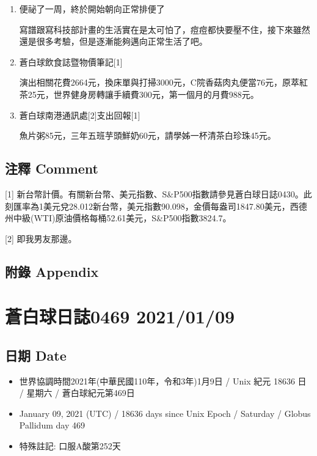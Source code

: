 \documentclass[
]{article}
\providecommand{\tightlist}{%
  \setlength{\itemsep}{0pt}\setlength{\parskip}{0pt}}
\begin{document}
\begin{enumerate}
\def\labelenumi{\arabic{enumi}.}
\item
  便祕了一周，終於開始朝向正常排便了

  寫譜跟寫科技部計畫的生活實在是太可怕了，痘痘都快要壓不住，接下來雖然還是很多考驗，但是逐漸能夠邁向正常生活了吧。
\item
  蒼白球飲食誌暨物價筆記{[}1{]}

  演出相關花費2664元，換床單與打掃3000元，C院香菇肉丸便當76元，原萃紅茶25元，世界健身房轉讓手續費300元，第一個月的月費988元。
\item
  蒼白球南港通訊處{[}2{]}支出回報{[}1{]}

  魚片粥85元，三年五班芋頭鮮奶60元，請學姊一杯清茶白珍珠45元。
\end{enumerate}

\hypertarget{ux6ce8ux91cb-comment-7}{%
\subsection{注釋 Comment}\label{ux6ce8ux91cb-comment-7}}

{[}1{]}
新台幣計價。有關新台幣、美元指數、S\&P500指數請參見蒼白球日誌0430。此刻匯率為1美元兌28.012新台幣，美元指數90.098，金價每盎司1847.80美元，西德州中級(WTI)原油價格每桶52.61美元，S\&P500指數3824.7。

{[}2{]} 即我男友那邊。

\hypertarget{ux9644ux9304-appendix-7}{%
\subsection{附錄 Appendix}\label{ux9644ux9304-appendix-7}}

\hypertarget{ux84bcux767dux7403ux65e5ux8a8c0469-20210109}{%
\section{蒼白球日誌0469
2021/01/09}\label{ux84bcux767dux7403ux65e5ux8a8c0469-20210109}}

\hypertarget{ux65e5ux671f-date-8}{%
\subsection{日期 Date}\label{ux65e5ux671f-date-8}}

\begin{itemize}
\tightlist
\item
  世界協調時間2021年(中華民國110年，令和3年)1月9日 / Unix 紀元 18636 日
  / 星期六 / 蒼白球紀元第469日
\item
  January 09, 2021 (UTC) / 18636 days since Unix Epoch / Saturday /
  Globus Pallidum day 469
\item
  特殊註記: 口服A酸第252天
\end{itemize}
\end{document}
